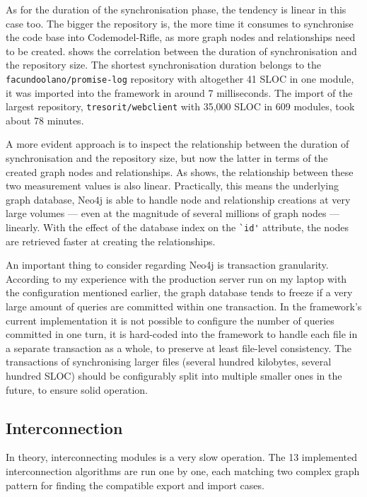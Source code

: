 As for the duration of the synchronisation phase, the tendency is linear in this case too. The bigger the repository is, the more time it consumes to synchronise the code base into Codemodel-Rifle, as more graph nodes and relationships need to be created.  shows the correlation between the duration of synchronisation and the repository size. The shortest synchronisation duration belongs to the \lstinline{facundoolano/promise-log} repository with altogether 41 SLOC in one module, it was imported into the framework in around 7 milliseconds. The import of the largest repository, \lstinline{tresorit/webclient} with 35,000 SLOC in 609 modules, took about 78 minutes.

A more evident approach is to inspect the relationship between the duration of synchronisation and the repository size, but now the latter in terms of the created graph nodes and relationships. As  shows, the relationship between these two measurement values is also linear. Practically, this means the underlying graph database, Neo4j is able to handle node and relationship creations at very large volumes — even at the magnitude of several millions of graph nodes — linearly. With the effect of the database index on the \lstinline{`id'} attribute, the nodes are retrieved faster at creating the relationships.

An important thing to consider regarding Neo4j is transaction granularity. According to my experience with the production server run on my laptop with the configuration mentioned earlier, the graph database tends to freeze if a very large amount of queries are committed within one transaction. In the framework's current implementation it is not possible to configure the number of queries committed in one turn, it is hard-coded into the framework to handle each file in a separate transaction as a whole, to preserve at least file-level consistency. The transactions of synchronising larger files (several hundred kilobytes, several hundred SLOC) should be configurably split into multiple smaller ones in the future, to ensure solid operation.


\subsection{Interconnection}

In theory, interconnecting \es modules is a very slow operation. The 13 implemented interconnection algorithms are run one by one, each matching two complex graph pattern for finding the compatible export and import cases.

